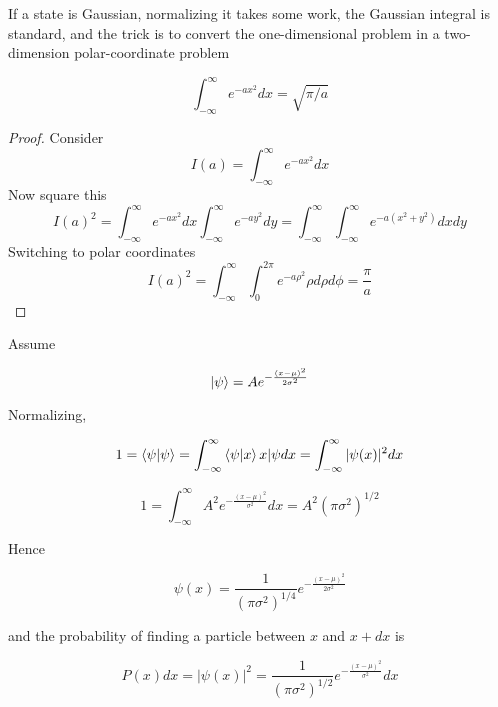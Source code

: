 \documentclass{tufte-book}
\newcommand{\infint}{\int^{\infty}_{-\infty}}
\begin{document}
If a state is Gaussian, normalizing it takes some work, the Gaussian integral is standard, and the trick is to convert the one-dimensional problem in a two-dimension polar-coordinate problem

\begin{equation}
	\label{eq:gauss}
	\infint e^{-ax^2}dx = \sqrt{\pi/a}
\end{equation}

\begin{proof}
	Consider
	\[
		I(a) = \infint e^{-ax^2}dx
	\]
	Now square this
	\[
		I(a)^2 = \infint e^{-ax^2}dx \infint e^{-ay^2}dy = \infint\infint e^{-a(x^2+y^2)}dxdy
	\]
	Switching to polar coordinates
	\[
		I(a)^2 = \infint \int^{2\pi}_{0}e^{-a\rho^2}\rho d\rho d\phi = \frac{\pi}{a}
	\]
\end{proof}

Assume

\begin{equation}
	\label{eq:38}
	\ket{\psi} = Ae^{-\frac{(x-\mu)^2}{2\sigma^2}}
\end{equation}

Normalizing,

\begin{equation}
	\label{eq:39}
	1 = \braket{\psi|\psi} = \infint \braket{\psi|x}{x|\psi}dx = \infint|\psi(x)|^2dx
\end{equation}

\begin{equation}
	\label{eq:40}
	1 = \infint A^2e^{-\frac{(x-\mu)^2}{\sigma^2}}dx = A^2(\pi\sigma^2)^{1/2}
\end{equation}

Hence

\begin{equation}
	\label{eq:41}
	\psi(x) = \frac{1}{(\pi\sigma^2)^{1/4}}e^{-\frac{(x-\mu)^2}{2\sigma^2}}
\end{equation}

and the probability of finding a particle between $x$ and $x + dx$ is

\begin{equation}
	\label{eq:42}
	P(x)dx = |\psi(x)|^2 = \frac{1}{(\pi\sigma^2)^{1/2}}e^{-\frac{(x-\mu)^2}{\sigma^2}}dx
\end{equation}





\backmatter





\printindex
\end{document}
